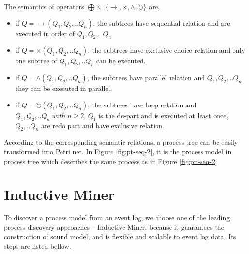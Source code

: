 \begin{definition} 
	The semantics of operators $\bigoplus \subseteq \{\rightarrow, \times, \land, \circlearrowright \}$ are,
	\begin{itemize}
		\item if $Q= \rightarrow(Q_1 , Q_2 ,.. Q_n)$, the subtrees have sequential relation and are executed in order of $Q_1,Q_2,..Q_n$
		\item if $Q= \times(Q_1 , Q_2 ,.. Q_n)$,  the subtrees have exclusive choice relation and only one subtree of $Q_1,Q_2,..Q_n$   can be executed.
		\item if $Q= \land (Q_1 , Q_2 ,.. Q_n)$,  the subtrees have parallel relation and $Q_1,Q_2,..Q_n$ they can be executed in parallel.
		\item if $Q= \circlearrowright(Q_1 , Q_2 ,.. Q_n)$,  the subtrees have loop relation and $Q_1,Q_2,..Q_n \; with\; n\geq2$, $Q_1$ is the do-part and is executed at least once, $Q_2,..Q_n$ are redo part and have exclusive relation.
	\end{itemize}
\end{definition}
According to the corresponding semantic relations,  a process tree can be easily transformed into Petri net. In Figure \ref{fig:pt-seq-2}, it is the process model in process tree which describes the same process as in Figure \ref{fig:pn-seq-2}. 
\section{Inductive Miner}
To discover a process model from an event log, we choose one of the leading process discovery approaches -- Inductive Miner, because it guarantees the construction of sound model, and is flexible and scalable to event log data. Its steps are listed bellow. 
